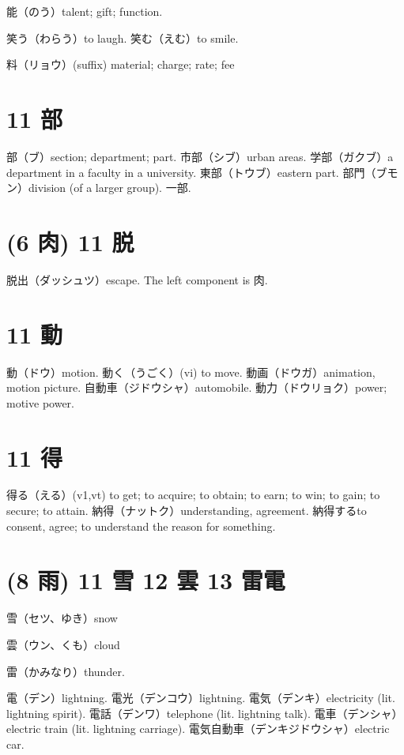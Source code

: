 能（のう）talent; gift; function.

笑う（わらう）to laugh.
笑む（えむ）to smile.

料（リョウ）(suffix) material; charge; rate; fee

\section{11 部}

部（ブ）section; department; part.
市部（シブ）urban areas.
学部（ガクブ）a department in a faculty in a university.
東部（トウブ）eastern part.
部門（ブモン）division (of a larger group).
一部.

\section{(6 肉) 11 脱}

脱出（ダッシュツ）escape.
The left component is 肉.

\section{11 動}

動（ドウ）motion.
動く（うごく）(vi) to move.
動画（ドウガ）animation, motion picture.
自動車（ジドウシャ）automobile.
動力（ドウリョク）power; motive power.

\section{11 得}

得る（える）(v1,vt) to get; to acquire; to obtain; to earn; to win; to gain; to secure; to attain.
納得（ナットク）understanding, agreement.
納得するto consent, agree; to understand the reason for something.

\section{(8 雨) 11 雪 12 雲 13 雷電}

雪（セツ、ゆき）snow

雲（ウン、くも）cloud

雷（かみなり）thunder.

電（デン）lightning.
電光（デンコウ）lightning.
電気（デンキ）electricity (lit. lightning spirit).
電話（デンワ）telephone (lit. lightning talk).
電車（デンシャ）electric train (lit. lightning carriage).
電気自動車（デンキジドウシャ）electric car.

